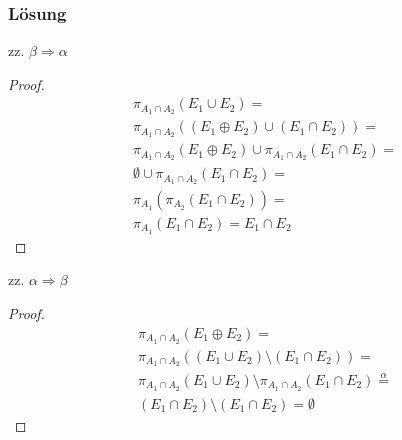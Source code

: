 \documentclass[a4paper]{scrartcl}
\begin{document}
\subsubsection*{Lösung}

zz. $\beta \Rightarrow \alpha$\\
\begin{proof}
\begin{align*}
	& \pi_{A_1 \cap A_2}\left(E_1 \cup E_2\right) = \\
    & \pi_{A_1 \cap A_2}\left(\left(E_1 \oplus E_2\right) \cup \left(E_1 \cap E_2\right)\right) = \\
	& \pi_{A_1 \cap A_2}\left(E_1 \oplus E_2\right) \cup \pi_{A_1 \cap A_2}\left(E_1 \cap E_2\right) = \\
	& \emptyset \cup \pi_{A_1 \cap A_2}\left(E_1 \cap E_2\right) =\\
	& \pi_{A_1}\left(\pi_{A_2}\left(E_1 \cap E_2\right)\right) = \\
	& \pi_{A_1}\left(E_1 \cap E_2\right) =
	E_1 \cap E_2
\end{align*} 
\end{proof}

zz. $\alpha \Rightarrow \beta$\\
\begin{proof}
	\begin{align*}
		& \pi_{A_1 \cap A_2}\left(E_1 \oplus E_2\right) = \\
		& \pi_{A_1 \cap A_2}\left(\left(E_1 \cup E_2\right) \setminus \left(E_1 \cap E_2\right)\right) = \\
		& \pi_{A_1 \cap A_2} \left(E_1 \cup E_2\right) \setminus \pi_{A_1 \cap A_2} \left(E_1 \cap E_2\right) \overset{\alpha}{=} \\
		& \left(E_1 \cap E_2\right) \setminus \left(E_1 \cap E_2\right) = \emptyset
	\end{align*}
\end{proof}
\end{document}
